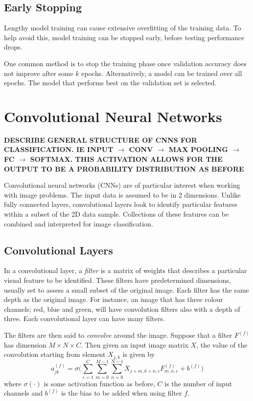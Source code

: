 \subsection{Early Stopping}\label{nnets-earlystop}

Lengthy model training can cause extensive overfitting of the training data. To help avoid this, model training can be stopped early, before testing performance drops.

One common method is to stop the training phase once validation accuracy does not improve after some $k$ epochs. Alternatively, a model can be trained over all epochs. The model that performs best on the validation set is selected.

\section{Convolutional Neural Networks}\label{convnets}

\textbf{DESCRIBE GENERAL STRUCTURE OF CNNS FOR CLASSIFICATION. IE INPUT $\rightarrow$ CONV $\rightarrow$ MAX POOLING $\rightarrow$ FC $\rightarrow$ SOFTMAX. THIS ACTIVATION ALLOWS FOR THE OUTPUT TO BE A PROBABILITY DISTRIBUTION AS BEFORE}

Convolutional neural networks (CNNs) are of particular interest when working with image problems. The input data is assumed to be in 2 dimensions. Unlike fully connected layers, convolutional layers look to identify particular features within a subset of the 2D data sample. Collections of these features can be combined and interpreted for image classification.

\subsection{Convolutional Layers}\label{convnets-convlayer}

In a convolutional layer, a \textit{filter} is a matrix of weights that describes a particular visual feature to be identified. These filters have predetermined dimensions, usually set to assess a small subset of the original image. Each filter has the same depth as the original image. For instance, an image that has three colour channels; red, blue and green, will have convolution filters also with a depth of three. Each convolutional layer can have many filters.

The filters are then said to \textit{convolve} around the image. Suppose that a filter $F^{(f)}$ has dimension $M\times N \times C$. Then given an input image matrix $X$, the value of the convolution starting from element $X_{j,k}$ is given by
\[
	a_{jk}^{(f)} = \sigma\bigg(\sum_{c=1}^C\sum_{m=0}^{M-1}\sum_{n=0}^{N-1}X_{j+m, k+n, c}F_{m,n,c}^{(f)}  + b^{(f)}\bigg)
\]
where $\sigma(\cdot)$ is some activation function as before, $C$ is the number of input channels and $b^{(f)}$ is the bias to be added when using filter $f$. 

